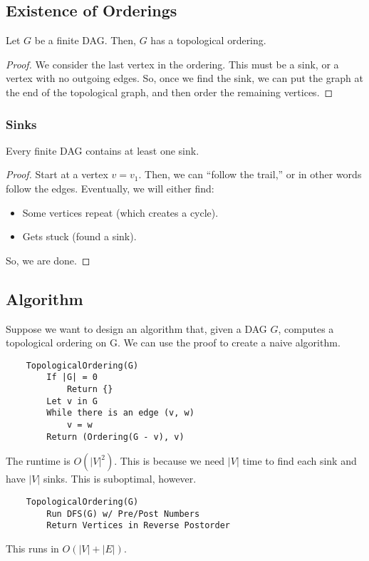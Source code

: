 \documentclass[letterpaper]{article}
\begin{document}
\subsection{Existence of Orderings}
\begin{theorem}{}{}
    Let $G$ be a finite DAG. Then, $G$ has a topological ordering.
\end{theorem}

\begin{mdframed}[]
    \begin{proof}
        We consider the last vertex in the ordering. This must be a sink, or a vertex with no outgoing edges. So, once we find the sink, we can put the graph at the end of the topological graph, and then order the remaining vertices. 
    \end{proof}
\end{mdframed}

\subsubsection{Sinks}
\begin{lemma}{}{}
    Every finite DAG contains at least one sink. 
\end{lemma}

\begin{mdframed}[]
    \begin{proof}
        Start at a vertex $v = v_1$. Then, we can ``follow the trail,'' or in other words follow the edges. Eventually, we will either find: 
        \begin{itemize}
            \item Some vertices repeat (which creates a cycle).
            \item Gets stuck (found a sink).
        \end{itemize}
        So, we are done. 
    \end{proof}
\end{mdframed}

\subsection{Algorithm}
Suppose we want to design an algorithm that, given a DAG $G$, computes a topological ordering on G. We can use the proof to create a naive algorithm. 
\begin{verbatim}
    TopologicalOrdering(G)
        If |G| = 0
            Return {}
        Let v in G 
        While there is an edge (v, w)
            v = w
        Return (Ordering(G - v), v)
\end{verbatim}
The runtime is $O(|V|^2)$. This is because we need $|V|$ time to find each sink and have $|V|$ sinks. This is suboptimal, however.
\begin{verbatim}
    TopologicalOrdering(G)
        Run DFS(G) w/ Pre/Post Numbers 
        Return Vertices in Reverse Postorder
\end{verbatim}
This runs in $O(|V| + |E|)$.
\end{document}
